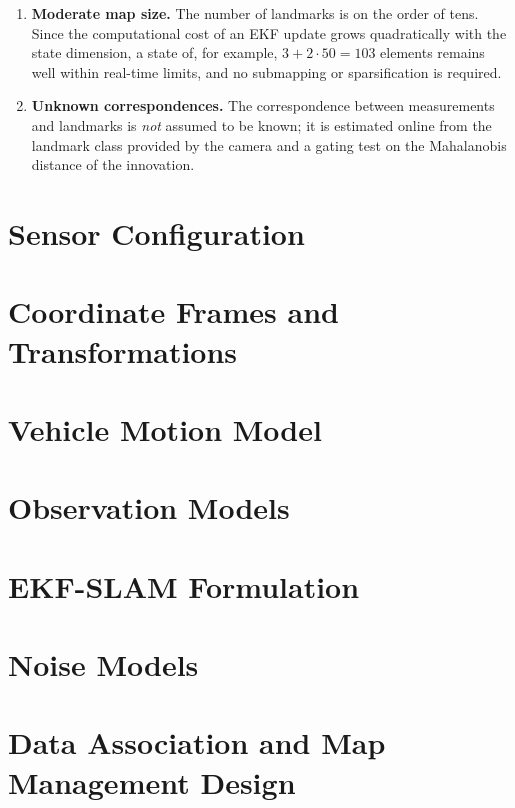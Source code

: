 \begin{enumerate}[label=\textbf{A\arabic*}, ref=A\arabic*, leftmargin=*]
  \item\label{asm:map-size}
  \textbf{Moderate map size.} The number of landmarks is on the order of
  tens. Since the computational cost of an EKF update grows quadratically
  with the state dimension, a state of, for example,
  $3 + 2 \cdot 50 = 103$ elements remains well within real-time limits, and
  no submapping or sparsification is required.

  \item\label{asm:association}
  \textbf{Unknown correspondences.} The correspondence between measurements
  and landmarks is \emph{not} assumed to be known; it is estimated online
  from the landmark class provided by the camera and a gating test on the
  Mahalanobis distance of the innovation.
\end{enumerate}

\section{Sensor Configuration}
\label{sec:system-design-sensor-configuration}

\section{Coordinate Frames and Transformations}
\label{sec:system-design-coordinate-frames}

\section{Vehicle Motion Model}
\label{sec:system-design-motion-model}

\section{Observation Models}
\label{sec:system-design-observation-models}

\section{EKF-SLAM Formulation}
\label{sec:system-design-ekf-slam-formulation}

\section{Noise Models}
\label{sec:system-design-noise-models}

\section{Data Association and Map Management Design}
\label{sec:system-design-data-association}
